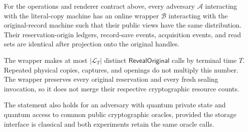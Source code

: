 \begin{lemma}
\label{lem:alias-normalization}
For the operations and renderer contract above, every adversary
$\mathcal A$ interacting with the literal-copy machine has an online wrapper
$\mathcal B$ interacting with the original-record machine such that their
public views have the same distribution.  Their reservation-origin ledgers,
record-save events, acquisition events, and read sets are identical after
projection onto the original handles.

The wrapper makes at most $|\mathcal L_T|$ distinct
$\mathsf{RevealOriginal}$ calls by terminal time $T$.  Repeated physical
copies, captures, and openings do not multiply this number.  The wrapper
preserves every original reservation and every fresh sealing invocation, so
it does not merge their respective cryptographic resource counts.

The statement also holds for an adversary with quantum private state and
quantum access to common public cryptographic oracles, provided the storage
interface is classical and both experiments retain the same oracle calls.
\end{lemma}

